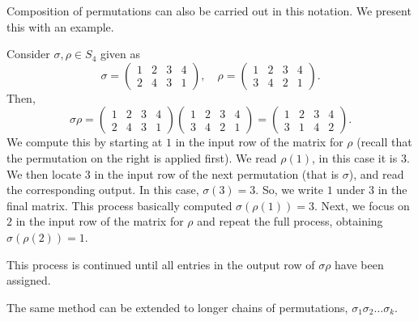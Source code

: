 \documentclass[11pt]{penrose}
\begin{document}
Composition of permutations can also be carried out in this notation. We present this with an example.
\begin{negg}
    Consider $\sigma, \rho \in S_4$ given as
    \begin{equation*}
        \sigma = \begin{pmatrix} 1 & 2 & 3 & 4 \\ 2 & 4 & 3 & 1 \end{pmatrix},
        \quad
        \rho = \begin{pmatrix} 1 & 2 & 3 & 4 \\ 3 & 4 & 2 & 1 \end{pmatrix}.
    \end{equation*}
    Then,
    \begin{equation*}
        \sigma\rho
        = \begin{pmatrix} 1 & 2 & 3 & 4 \\ 2 & 4 & 3 & 1 \end{pmatrix}
        \begin{pmatrix} 1 & 2 & 3 & 4 \\ 3 & 4 & 2 & 1 \end{pmatrix}
        = \begin{pmatrix} 1 & 2 & 3 & 4 \\ 3 & 1 & 4 & 2 \end{pmatrix}.
    \end{equation*}
    We compute this by starting at $1$ in the input row of the matrix for $\rho$ (recall that the permutation on the right is applied first). We read $\rho(1)$, in this case it is $3$. We then locate $3$ in the input row of the next permutation (that is $\sigma$), and read the corresponding output. In this case, $\sigma(3) = 3$. So, we write $1$ under $3$ in the final matrix. This process basically computed $\sigma(\rho(1)) = 3$. Next, we focus on $2$ in the input row of the matrix for $\rho$ and repeat the full process, obtaining $\sigma(\rho(2)) = 1$.

    This process is continued until all entries in the output row of $\sigma\rho$ have been assigned.
\end{negg}

The same method can be extended to longer chains of permutations, $\sigma_1 \sigma_2 \dots \sigma_k$.
\end{document}
